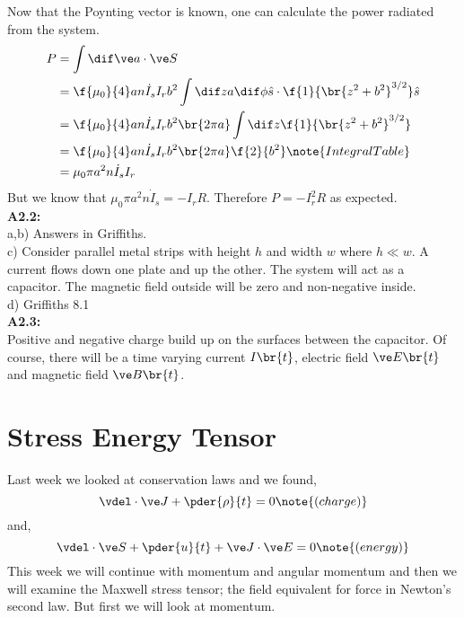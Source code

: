 \documentclass{article}
\begin{document}
Now that the Poynting vector is known, one can calculate the power radiated from the system.
\begin{align*}
P &= \int \dif \ve a \cdot \ve S \\
&= \f{\mu_0}{4} a n \dot I_s I_r b^2 \int \dif z a \dif \phi \hat s \cdot \f{1}{\br{z^2 + b^2}^{3/2}} \hat{s} \\
&= \f{\mu_0}{4} a n \dot I_s I_r b^2 \br{2 \pi a} \int \dif z \f{1}{\br{z^2 + b^2}^{3/2}} \\
&= \f{\mu_0}{4} a n \dot I_s I_r b^2 \br{2 \pi a} \f{2}{b^2} \note{Integral Table} \\
&= \mu_0 \pi a^2 n \dot I_s I_r
\end{align*}
But we know that $\mu_0 \pi a^2 n \dot I_s = - I_r R$. Therefore $P = - I_r^2 R$ as expected.\\
\textbf{A2.2:}\\
a,b) Answers in Griffiths. \\
c) Consider parallel metal strips with height $h$ and width $w$ where $h \ll w$. A current flows down one plate and up the other. The system will act as a capacitor. The magnetic field outside will be zero and non-negative inside. \\
d) Griffiths 8.1 \\
\textbf{A2.3:}\\
Positive and negative charge build up on the surfaces between the capacitor. Of course, there will be a time varying current $I\br{t}$, electric field $\ve E \br{t}$ and magnetic field $\ve B \br{t}$.
\section{Stress Energy Tensor}

Last week we looked at conservation laws and we found,
\[ \vdel \cdot \ve J + \pder{\rho}{t} = 0 \note{(charge)} \]
and,
\[ \vdel \cdot \ve S + \pder{u}{t} + \ve J \cdot \ve E = 0 \note{(energy)} \]
This week we will continue with momentum and angular momentum and then we will examine the Maxwell stress tensor; the field equivalent for force in Newton's second law. But first we will look at momentum.
\end{document}
